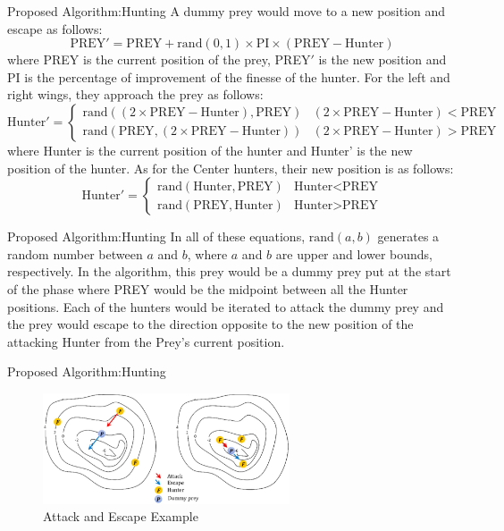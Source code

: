 \documentclass{beamer}
\begin{document}
\begin{frame}{Proposed Algorithm:Hunting}
A dummy prey would move to a new position and escape as follows:
$$\text{PREY}' = \text{PREY} + \text{rand}(0,1) \times \text{PI} \times (\text{PREY} - \text{Hunter})$$
where PREY is the current position of the prey, PREY$'$ is the new position and PI is the percentage of improvement of the finesse of the hunter.
For the left and right wings, they approach the prey as follows:
\[ \text{Hunter}' =  \begin{cases} 
      \text{rand}((2 \times \text{PREY} - \text{Hunter}), \text{PREY}) & (2 \times \text{PREY} - \text{Hunter}) < \text{PREY} \\
      \text{rand}(\text{PREY}, (2 \times \text{PREY} - \text{Hunter})) & (2 \times \text{PREY} - \text{Hunter}) > \text{PREY}
   \end{cases}
\]
where Hunter is the current position of the hunter and Hunter' is the new position of the hunter.
As for the Center hunters, their new position is as follows:
\[ \text{Hunter}' =  \begin{cases} 
      \text{rand}(\text{Hunter}, \text{PREY}) & \text{Hunter} < \text{PREY} \\
      \text{rand}(\text{PREY}, \text{Hunter}) & \text{Hunter} > \text{PREY}
   \end{cases}
\]
\end{frame}
\begin{frame}{Proposed Algorithm:Hunting}
In all of these equations, $\text{rand}(a,b)$ generates a random number between $a$ and $b$, where $a$ and $b$ are upper and lower bounds, respectively.
In the algorithm, this prey would be a dummy prey put at the start of the phase where PREY would be the midpoint between all the Hunter positions. Each of the hunters would be iterated to attack the dummy prey and the prey would escape to the direction opposite to the new position of the attacking Hunter from the Prey's current position.
\end{frame}
\begin{frame}{Proposed Algorithm:Hunting}
\begin{figure}[h]
\begin{center}
\includegraphics[width=0.65\textwidth]{img/pa/hunting_attack}
\caption{Attack and Escape Example}
\end{center}
\end{figure}
\end{frame}
\end{document}
